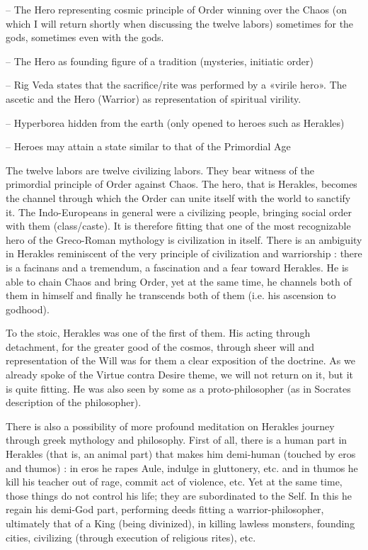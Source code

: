 \begin{footnotesize}
\begin{sffamily}
-- The Hero representing cosmic principle of Order winning over the Chaos (on which I will return shortly when discussing the twelve labors) sometimes for the gods, sometimes even with the gods.

-- The Hero as founding figure of a tradition (mysteries, initiatic order)

-- Rig Veda states that the sacrifice/rite was performed by a «virile hero». The ascetic and the Hero (Warrior) as representation of spiritual virility.

-- Hyperborea hidden from the earth (only opened to heroes such as Herakles)

-- Heroes may attain a state similar to that of the Primordial Age

The twelve labors are twelve civilizing labors. They bear witness of the primordial principle of Order against Chaos. The hero, that is Herakles, becomes the channel through which the Order can unite itself with the world to sanctify it. The Indo-Europeans in general were a civilizing people, bringing social order with them (class/caste). It is therefore fitting that one of the most recognizable hero of the Greco-Roman mythology is civilization in itself. There is an ambiguity in Herakles reminiscent of the very principle of civilization and warriorship : there is a facinans and a tremendum, a fascination and a fear toward Herakles. He is able to chain Chaos and bring Order, yet at the same time, he channels both of them in himself and finally he transcends both of them (i.e. his ascension to godhood).

To the stoic, Herakles was one of the first of them. His acting through detachment, for the greater good of the cosmos, through sheer will and representation of the Will was for them a clear exposition of the doctrine. As we already spoke of the Virtue contra Desire theme, we will not return on it, but it is quite fitting. He was also seen by some as a proto-philosopher (as in Socrates description of the philosopher).

There is also a possibility of more profound meditation on Herakles journey through greek mythology and philosophy. First of all, there is a human part in Herakles (that is, an animal part) that makes him demi-human (touched by eros and thumos) : in eros he rapes Aule, indulge in gluttonery, etc. and in thumos he kill his teacher out of rage, commit act of violence, etc. Yet at the same time, those things do not control his life; they are subordinated to the Self. In this he regain his demi-God part, performing deeds fitting a warrior-philosopher, ultimately that of a King (being divinized), in killing lawless monsters, founding cities, civilizing (through execution of religious rites), etc.


\end{sffamily}
\end{footnotesize}
